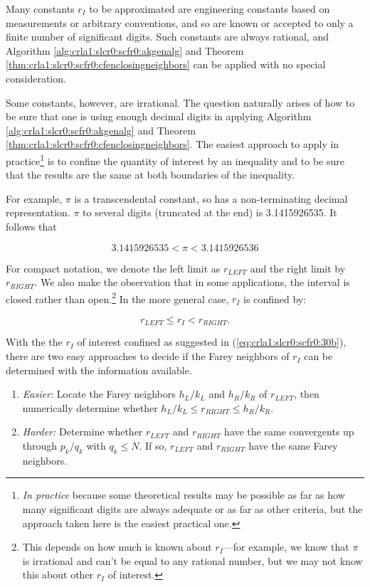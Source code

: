 Many constants $r_I$ to be approximated are engineering constants based
on measurements or arbitrary conventions, and so are known or accepted to
only a finite number of significant digits.  Such constants are always
rational, and 
Algorithm \ref{alg:crla1:slcr0:scfr0:akgenalg}
and
Theorem \ref{thm:crla1:slcr0:scfr0:cfenclosingneighbors}
can be applied with no special consideration.

Some constants, however, are irrational.  The question naturally arises
of how to be sure that one is using enough decimal digits
in applying 
Algorithm \ref{alg:crla1:slcr0:scfr0:akgenalg}
and
Theorem \ref{thm:crla1:slcr0:scfr0:cfenclosingneighbors}.
The easiest approach to apply in practice\footnote{\emph{In practice}
because some theoretical results may be possible as far as how
many significant digits are always adequate or as far as other
criteria, but the approach taken here is the easiest practical one.}
is to confine the quantity of interest by an inequality and to be
sure that the results are the same at both boundaries
of the inequality.

For example, $\pi$ is a transcendental constant, so has a non-terminating
decimal representation.  $\pi$ to several digits (truncated at the
end) is 3.1415926535.  It follows that

\begin{equation}
\label{eq:crla1:slcr0:scfr0:30}
3.1415926535 < \pi < 3.1415926536
\end{equation}  

For compact notation, we denote the left limit as $r_{LEFT}$ and the
right limit by $r_{RIGHT}$.  We also make the observation that in some
applications, the interval is closed rather than open.\footnote{This depends
on how much is known about $r_I$---for example, we know that $\pi$ is irrational and
can't be equal to any rational number, but we
may not know this about other $r_I$ of interest.}  In the more
general case, $r_I$ is confined by:

\begin{equation}
\label{eq:crla1:slcr0:scfr0:30b}
r_{LEFT} \leq r_I < r_{RIGHT} .
\end{equation}  

With the the $r_I$ of interest confined as suggested in 
(\ref{eq:crla1:slcr0:scfr0:30b}), there are two easy approaches
to decide if the Farey neighbors of $r_I$ can be determined with
the information available.

\begin{enumerate}
\item \emph{Easier:} Locate the Farey neighbors $h_L/k_L$ and $h_R/k_R$ of
      $r_{LEFT}$, then numerically determine whether 
      $h_L/k_L \leq r_{RIGHT} \leq h_R/k_R$.
\item \emph{Harder:} Determine whether $r_{LEFT}$ and $r_{RIGHT}$ have the
      same convergents up through $p_k/q_k$ with $q_k \leq N$.  If so,
      $r_{LEFT}$ and $r_{RIGHT}$ have the same Farey neighbors.
\end{enumerate}

